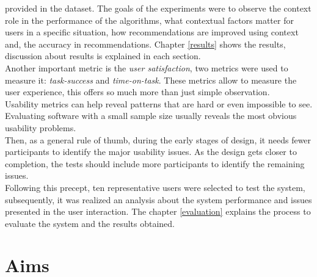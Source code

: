 provided in the dataset. The goals of the experiments were to observe
the context role in the performance of the algorithms, what contextual
factors matter for users in a specific situation, how recommendations
are improved using context and, the accuracy in recommendations.
Chapter \ref{results} shows the results, discussion about results is
explained in each section.\\
Another important metric is the \textit{user satisfaction}, two
metrics were used to measure it: \textit{task-success} and \textit
{time-on-task}. These metrics allow to measure the user experience,
this offers so much more than just simple observation.\\ Usability
metrics can help reveal patterns that are hard or even impossible to
see. Evaluating software with a small sample size usually reveals the
most obvious usability problems\cite{albert2013measuring}.\\ Then, as
a general rule of thumb, during the early stages of design, it needs
fewer participants to identify the major usability issues. As the
design gets closer to completion, the tests should include more
participants to identify the remaining
issues\cite{albert2013measuring}.\\ 
Following this precept, ten representative users were selected to test
the system, subsequently, it was realized an analysis about the system
performance and issues presented in the user interaction. The chapter
\ref{evaluation} explains the process to evaluate the system and the
results obtained.

\section{Aims}

